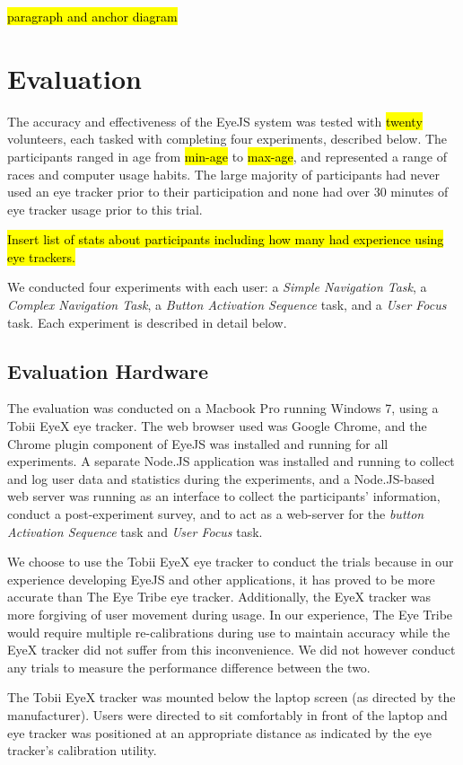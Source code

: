 \documentclass{sigchi}
\begin{document}
\hl{paragraph and anchor diagram}



\section{Evaluation}
The accuracy and effectiveness of the EyeJS system was tested with \hl{twenty} volunteers, each tasked with completing four experiments, described below. The participants ranged in age from \hl{min-age} to \hl{max-age}, and represented a range of races and computer usage habits. The large majority of participants had never used an eye tracker prior to their participation and none had over 30 minutes of eye tracker usage prior to this trial.

\hl{Insert list of stats about participants including how many had experience using eye trackers.}

We conducted four experiments with each user: a \emph{Simple Navigation Task}, a \emph{Complex Navigation Task}, a \emph{Button Activation Sequence} task, and a \emph{User Focus} task. Each experiment is described in detail below.

\subsection{Evaluation Hardware}
The evaluation was conducted on a Macbook Pro running Windows 7, using a Tobii EyeX eye tracker. The web browser used was Google Chrome, and the Chrome plugin component of EyeJS was installed and running for all experiments. A separate Node.JS application was installed and running to collect and log user data and statistics during the experiments, and a Node.JS-based web server was running as an interface to collect the participants' information, conduct a post-experiment survey, and to act as a web-server for the \emph{button Activation Sequence} task and \emph{User Focus} task.

We choose to use the Tobii EyeX eye tracker to conduct the trials because in our experience developing EyeJS and other applications, it has proved to be more accurate than The Eye Tribe eye tracker. Additionally, the EyeX tracker was more forgiving of user movement during usage. In our experience, The Eye Tribe would require multiple re-calibrations during use to maintain accuracy while the EyeX tracker did not suffer from this inconvenience. We did not however conduct any trials to measure the performance difference between the two. 

The Tobii EyeX tracker was mounted below the laptop screen (as directed by the manufacturer). Users were directed to sit comfortably in front of the laptop and eye tracker was positioned at an appropriate distance as indicated by the eye tracker's calibration utility. 
\end{document}
